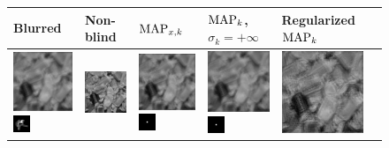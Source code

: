     \begin{figure}
    \centering
    \begin{tabular}{|l|l|l|l|l|l|}
 \hline 
Blurred & Non-blind & $\operatorname{MAP}_{x,k}$ & $\operatorname{MAP}_k$, $\sigma_k=+\infty$ & Regularized $\operatorname{MAP}_k$ \\ 
 \hline 
\includegraphics[width=2.5cm]{results/chocolate_kernel1_blurred.png}
\includegraphics[width=0.5cm]{images/kernel1}
& \includegraphics[width=2.5cm]{results/chocolate_kernel1_nonblind_deconv.png}
&\includegraphics[width=2.5cm]{results/chocolate_kernel1_MAPxk_x.png}
\includegraphics[width=0.5cm]{results/chocolate_kernel1_MAPxk_k.png}
&\includegraphics[width=2.5cm]{results/chocolate_kernel1_MAPk_x.png}
\includegraphics[width=0.5cm]{results/chocolate_kernel1_MAPk_k.png}
&\includegraphics[width=2.5cm]{results/chocolate_kernel1_MAPkreg_x.png}

\end{tabular}
\end{figure}
